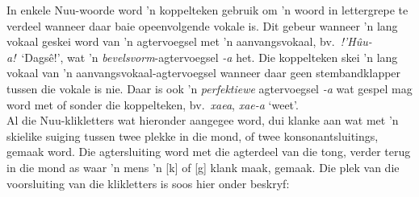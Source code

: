 In enkele N\textipa{\textvertline}uu-woorde word 'n koppelteken
gebruik om 'n woord in lettergrepe te verdeel wanneer daar baie
opeenvolgende vokale is. Dit gebeur wanneer 'n lang vokaal geskei word
van 'n agtervoegsel met 'n aanvangsvokaal, bv.\ \emph{!'H\^{u}u-a!}\
`Dags\^{e}!', wat 'n \emph{bevelsvorm}-agtervoegsel \emph{-a} het. Die
koppelteken skei 'n lang vokaal van 'n aanvangsvokaal-agtervoegsel
wanneer daar geen stembandklapper tussen die vokale is nie. Daar is
ook 'n \emph{perfektiewe} agtervoegsel \emph{-a} wat gespel mag word
met of sonder die koppelteken, bv.\
\emph{\textipa{\textdoublevertline}xaea},
\emph{\textipa{\textdoublevertline}xae-a} `weet'.\\

Al die N\textipa{\textvertline}uu-klikletters wat hieronder aangegee
word, dui klanke aan wat met 'n skielike suiging tussen twee plekke in
die mond, of twee konsonantsluitings, gemaak word. Die agtersluiting
word met die agterdeel van die tong, verder terug in die mond as waar
'n mens 'n [k] of [g] klank maak, gemaak. Die plek van die
voorsluiting van die klikletters is soos hier onder beskryf:
